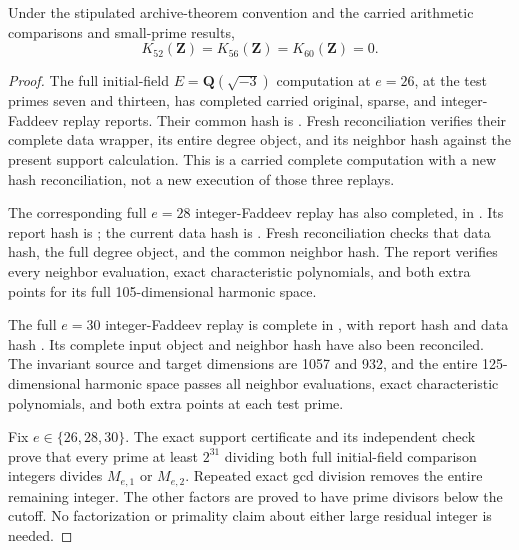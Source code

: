 \begin{theorem}[KT-K52-K56-K60-VANISH]
\label{thm:kt-k52-k56-k60-vanish}
Under the stipulated archive-theorem convention and the carried
arithmetic comparisons and small-prime results,
\[
       K_{52}(\mathbf Z)=K_{56}(\mathbf Z)=K_{60}(\mathbf Z)=0.
\]
\end{theorem}
\begin{proof}
The full initial-field $E=\mathbf Q(\sqrt{-3})$ computation at
$e=26$, at the test primes seven and thirteen, has completed
carried original, sparse, and integer-Faddeev replay reports.
Their common hash is
.
Fresh reconciliation verifies their complete data wrapper, its
entire degree object, and its neighbor hash against the present
support calculation.  This is a carried complete computation
with a new hash reconciliation, not a new execution of those
three replays.

The corresponding full $e=28$ integer-Faddeev replay has also
completed, in .  Its report hash is
;
the current data hash is
.
Fresh reconciliation checks that data hash, the full degree
object, and the common neighbor hash.  The report verifies every
neighbor evaluation, exact characteristic polynomials, and both
extra points for its full 105-dimensional harmonic space.

The full $e=30$ integer-Faddeev replay is complete in
, with report hash
and data hash
.
Its complete input object and neighbor hash have also been
reconciled.  The invariant source and target dimensions are
1057 and 932, and the entire 125-dimensional harmonic space
passes all neighbor evaluations, exact characteristic
polynomials, and both extra points at each test prime.

Fix $e\in\{26,28,30\}$.
The exact support certificate and its independent check prove
that every prime at least $2^{31}$ dividing both full
initial-field comparison integers divides $M_{e,1}$ or
$M_{e,2}$.  Repeated exact gcd division removes the entire
remaining integer.  The other factors are proved to have
prime divisors below the cutoff.  No factorization or primality
claim about either large residual integer is needed.


\end{proof}
